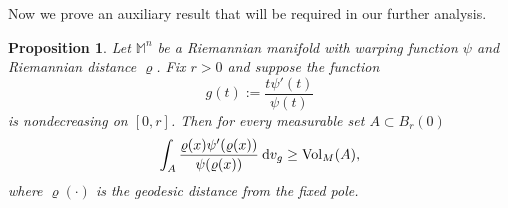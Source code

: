 \documentclass[a4paper,11pt,reqno]{amsart}
\theoremstyle{plain}
\newtheorem{proposition}{Proposition}[section]
\numberwithin{equation}{section} \allowdisplaybreaks
\newcommand{\dvg}{\: {\rm d}v_{g}}
\newcommand{\m}{\mathbb{M}^n}
\begin{document}
Now we prove an auxiliary result that will be required in our further analysis.
\begin{proposition}\label{vol upper bund}
    Let $\m$ be a Riemannian manifold with warping function $\psi$ and Riemannian distance $\varrho$. Fix $r>0$ and suppose the function 
    \begin{equation*}
        g(t):= \frac{t\psi'(t)}{\psi(t)}
    \end{equation*}
    is nondecreasing on $[0,r]$. Then for every measurable set $A\subset B_r(0)$
    \begin{equation*}
        \int_A\frac{\varrho(x)\psi'(\varrho(x))}{\psi(\varrho(x))}\dvg\geq \mathrm{Vol}_{M}(A),
    \end{equation*}
    where $\varrho(\cdot)$ is the geodesic distance from the fixed pole.
\end{proposition}
\end{document}

